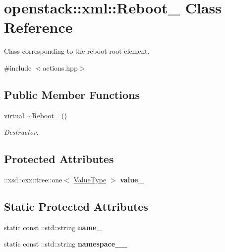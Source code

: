 \hypertarget{classopenstack_1_1xml_1_1Reboot__}{
\section{openstack::xml::Reboot\_\- Class Reference}
\label{classopenstack_1_1xml_1_1Reboot__}
}


Class corresponding to the reboot root element.  




{\ttfamily \#include $<$actions.hpp$>$}

\subsection*{Public Member Functions}
\begin{DoxyCompactItemize}
\item 
\hypertarget{classopenstack_1_1xml_1_1Reboot___ad81d26c170804226229fe0083cd4e761}{
virtual \hyperlink{classopenstack_1_1xml_1_1Reboot___ad81d26c170804226229fe0083cd4e761}{$\sim$Reboot\_\-} ()}
\label{classopenstack_1_1xml_1_1Reboot___ad81d26c170804226229fe0083cd4e761}

\begin{DoxyCompactList}\small\item\em Destructor. \item\end{DoxyCompactList}\end{DoxyCompactItemize}
\subsection*{Protected Attributes}
\begin{DoxyCompactItemize}
\item 
\hypertarget{classopenstack_1_1xml_1_1Reboot___ad90b0da9c31d4f86287614c697456aa6}{
::xsd::cxx::tree::one$<$ \hyperlink{classopenstack_1_1xml_1_1Reboot}{ValueType} $>$ {\bfseries value\_\-}}
\label{classopenstack_1_1xml_1_1Reboot___ad90b0da9c31d4f86287614c697456aa6}

\end{DoxyCompactItemize}
\subsection*{Static Protected Attributes}
\begin{DoxyCompactItemize}
\item 
\hypertarget{classopenstack_1_1xml_1_1Reboot___ac2c556dafe1adf3dfad105f59cb1c4e2}{
static const ::std::string {\bfseries name\_\-}}
\label{classopenstack_1_1xml_1_1Reboot___ac2c556dafe1adf3dfad105f59cb1c4e2}

\item 
\hypertarget{classopenstack_1_1xml_1_1Reboot___a588bf73e97421b8d061ba0dd1fc52819}{
static const ::std::string {\bfseries namespace\_\-\_\-}}
\label{classopenstack_1_1xml_1_1Reboot___a588bf73e97421b8d061ba0dd1fc52819}

\end{DoxyCompactItemize}
